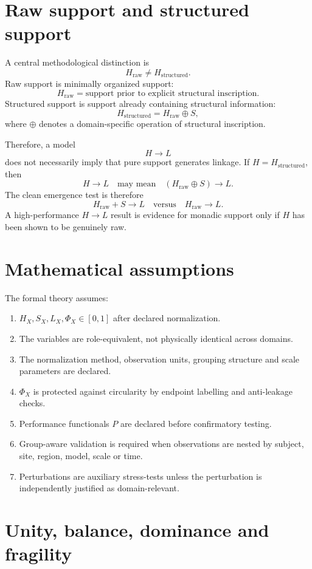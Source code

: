 \documentclass[11pt,a4paper]{article}
\newcommand{\Hraw}{H_{\mathrm{raw}}}
\newcommand{\Hstr}{H_{\mathrm{structured}}}
\begin{document}
\section{Raw support and structured support}

A central methodological distinction is
\[
\Hraw \neq \Hstr.
\]
Raw support is minimally organized support:
\[
\Hraw=\text{support prior to explicit structural inscription}.
\]
Structured support is support already containing structural information:
\[
\Hstr=\Hraw\oplus S,
\]
where $\oplus$ denotes a domain-specific operation of structural inscription.

Therefore, a model
\[
H\rightarrow L
\]
does not necessarily imply that pure support generates linkage. If $H=\Hstr$, then
\[
H\rightarrow L
\quad\text{may mean}\quad
(\Hraw\oplus S)\rightarrow L.
\]
The clean emergence test is therefore
\[
\Hraw+S\rightarrow L
\quad\text{versus}\quad
\Hraw\rightarrow L.
\]
A high-performance $H\rightarrow L$ result is evidence for monadic support only if $H$ has been shown to be genuinely raw.

\section{Mathematical assumptions}

The formal theory assumes:
\begin{enumerate}
\item $H_X,S_X,L_X,\Phi_X\in[0,1]$ after declared normalization.
\item The variables are role-equivalent, not physically identical across domains.
\item The normalization method, observation units, grouping structure and scale parameters are declared.
\item $\Phi_X$ is protected against circularity by endpoint labelling and anti-leakage checks.
\item Performance functionals $P$ are declared before confirmatory testing.
\item Group-aware validation is required when observations are nested by subject, site, region, model, scale or time.
\item Perturbations are auxiliary stress-tests unless the perturbation is independently justified as domain-relevant.
\end{enumerate}

\section{Unity, balance, dominance and fragility}
\end{document}
